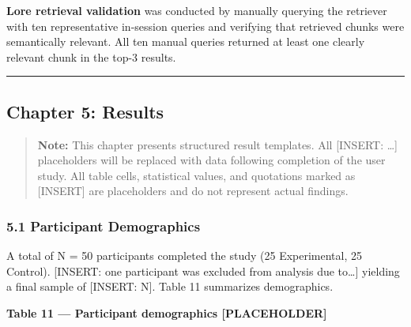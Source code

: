 \textbf{Lore retrieval validation} was conducted by manually querying
the retriever with ten representative in-session queries and verifying
that retrieved chunks were semantically relevant. All ten manual queries
returned at least one clearly relevant chunk in the top-3 results.

\begin{center}\rule{0.5\linewidth}{0.5pt}\end{center}

\subsection{Chapter 5: Results}\label{chapter-5-results}

\begin{quote}
\textbf{Note:} This chapter presents structured result templates. All
{[}INSERT: \ldots{]} placeholders will be replaced with data following
completion of the user study. All table cells, statistical values, and
quotations marked as {[}INSERT{]} are placeholders and do not represent
actual findings.
\end{quote}

\subsubsection{5.1 Participant
Demographics}\label{participant-demographics}

A total of N = 50 participants completed the study (25 Experimental, 25
Control). {[}INSERT: one participant was excluded from analysis due
to\ldots{]} yielding a final sample of {[}INSERT: N{]}. Table 11
summarizes demographics.

\textbf{Table 11 --- Participant demographics {[}PLACEHOLDER{]}}

